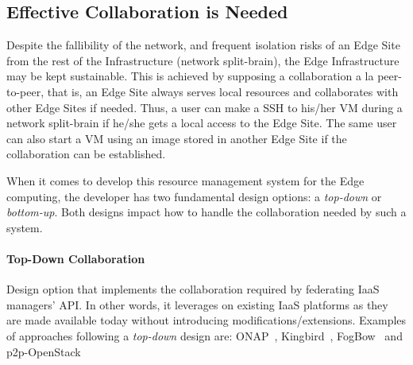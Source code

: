 \subsection{Effective Collaboration is Needed}

Despite the fallibility of the network, and frequent isolation risks
of an Edge Site from the rest of the Infrastructure (\ie network
split-brain), the Edge Infrastructure may be kept sustainable. This is
achieved by supposing a collaboration a la peer-to-peer, that is, an
Edge Site always serves local resources and collaborates with other
Edge Sites if needed. Thus, a user can make a SSH to his/her VM during a
network split-brain if he/she gets a local access to the Edge Site. The
same user can also start a VM using an image stored in another Edge Site if
the collaboration can be established.

When it comes to develop this resource management system for the Edge
computing, the developer has two fundamental design options: a \emph{top-down} or
\emph{bottom-up}. Both designs impact how to handle the
collaboration needed by such a system.

\paragraph{Top-Down Collaboration}
Design option that implements the collaboration required by
federating IaaS managers' API. In other words, it leverages on existing IaaS platforms as they are made available today without introducing modifications/extensions. Examples of approaches following a \emph{top-down} design are: ONAP~\cite{onap}, Kingbird~\cite{kingbird}, FogBow~\cite{brasileiro2016fogbow} and p2p-OpenStack~\cite{ericsson-p2p}


